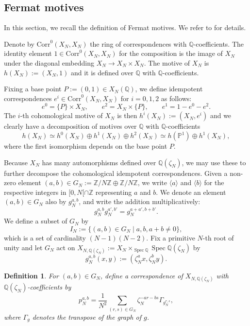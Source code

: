 \documentclass[11pt,a4,leqno]{amsart}
\theoremstyle{my theoremstyle}
\theoremstyle{dfn}
\newtheorem{dfn}[thm]{Definition}
\theoremstyle{remark}
\renewcommand{\1}{\mathbbm{1}}
\newcommand{\Z}{\mathbb{Z}}
\newcommand{\Q}{\mathbb{Q}}
\numberwithin{equation}{section}
\newcommand{\Spec}{\operatorname{Spec}}
\begin{document}
\subsection{Fermat motives} \label{subsec:motives}
In this section, we recall the definition of Fermat motives. We refer to \cite[Section 2]{Ots11} for details. 

Denote by $\mathrm{Corr}^0(X_N,X_N)$ the ring of correspondences with $\Q$-coefficients. The identity element $1 \in \mathrm{Corr}^0(X_N,X_N)$ for the composition is the image of $X_N$ under the diagonal embedding $X_N\to X_N\times X_N$. The motive of $X_N$ is $h(X_N):=(X_N, 1)$ and it is defined over $\Q$ with $\Q$-coefficients.

Fixing a base point $P:=(0,1)\in X_N(\Q)$, we define idempotent correspondences $e^i \in \mathrm{Corr}^0(X_N,X_N)$ for $i=0,1,2$ as follows:
\[
e^0 = \{ P \} \times X_N, \qquad e^2 =  X_N \times \{ P \}, \qquad e^1=1-e^0-e^2.
\]
The $i$-th cohomological motive of $X_N$ is then $h^i(X_N):=(X_N, e^i)$ and we clearly have a decomposition of motives over $\Q$ with $\Q$-coefficients
\begin{equation} \label{decomp h0h1h2}
h(X_N)\simeq h^0(X_N)\oplus h^1(X_N) \oplus h^2(X_N) \simeq h(\mathbb{P}^1) \oplus h^1(X_N), 
\end{equation}
where the first isomorphism depends on the base point $P$.

Because $X_N$ has many automorphisms defined over $\Q(\zeta_N)$, we may use these to further decompose the cohomological idempotent correspondences.
Given a non-zero element $(a,b)\in G_N := \Z/N\Z \oplus \Z/N\Z$,  we write $\langle a \rangle$ and $\langle b \rangle$ for the respective integers  in $[ 0, N [\cap \Z$ representing $a$ and $b$. 
We denote an element $(a, b) \in G_N$ also by $g_N^{a, b}$, and write the addition multiplicatively:
$$g_N^{a, b} g_N^{a', b'}=g_N^{a+a', b+b'}.$$
We define a subset of $G_N$ by 
\[
I_N:= \{ (a,b) \in G_N \mid a,b,a+b\neq 0 \},
\]  
which is a set of cardinality $(N-1)(N-2)$. 
Fix a primitive $N$-th root of unity and let $G_N$ act on $X_{N, \Q(\zeta_N)}:=X_N \times_{\Spec{\Q}} \Spec{\Q(\zeta_N)}$ by  
\[
g_N^{a,b}(x,y):=(\zeta_N^a x,\zeta_N^b y).
\]
\begin{dfn} \label{def:pNab}
For $(a, b) \in G_N$, define 
a correspondence of $X_{N, \Q(\zeta_N)}$ with $\Q(\zeta_N)$-coefficients by 
$$p_N^{a, b}= \dfrac1{N^2} \sum_{(r, s) \in G_N} \zeta_N^{-ar-bs} \Gamma_{g_N^{r, s}}, $$
where $\Gamma_g$ denotes the transpose of the graph of $g$. 
\end{dfn}
\end{document}
